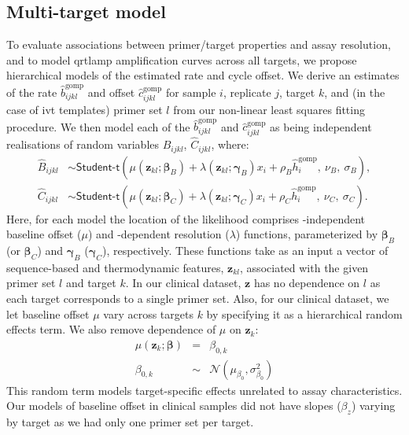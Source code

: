 \documentclass[../thesis.tex]{subfiles}
\begin{document}
\subsection{Multi-target model \label{sec:hierarchicalmodel}}
To evaluate associations between primer/target properties and assay resolution, and to model \gls{qrtlamp} amplification curves across all targets, we propose hierarchical models of the estimated rate and cycle offset. We derive an estimates of the  rate $\hat{b}^{\text{gomp}}_{ijkl}$ and offset $\hat{c}^{\text{gomp}}_{ijkl}$ for sample $i$, replicate $j$, target $k$, and (in the case of \gls{ivt}   templates) primer set $l$ from our non-linear least squares fitting procedure. We then model each of the $\hat{b}^{\text{gomp}}_{ijkl}$ and $\hat{c}^{\text{gomp}}_{ijkl}$ as being independent realisations of random variables $\hat{B}_{ijkl}$, $\hat{C}_{ijkl}$, where: 
\begin{align} 
    \hat{B}_{ijkl}  & \sim  \textsf{Student-t}(\mu(\bm{z}_{kl}; \bm{\beta}_B) + \lambda(\bm{z}_{kl}; \bm{\gamma}_B) x_i + \rho_B \hat{h}^{\text{gomp}}_{i}, \ \nu_B, \ \sigma_B), \label{eq:bhm} \\
    \hat{C}_{ijkl}  & \sim  \textsf{Student-t}(\mu(\bm{z}_{kl}; \bm{\beta}_C) + \lambda(\bm{z}_{kl}; \bm{\gamma}_C) x_i + \rho_C \hat{h}^{\text{gomp}}_{i}, \ \nu_C, \ \sigma_C). \label{eq:chm}
\end{align}
Here, for each model the location of the likelihood comprises -independent baseline offset ($\mu$) and -dependent resolution ($\lambda$) functions, parameterized by $\bm{\beta}_B$ (or $\bm{\beta}_C$) and $\bm{\gamma}_B$ ($\bm{\gamma}_C$), respectively. These functions take as an input a vector of sequence-based and thermodynamic features, $\bm{z}_{kl}$, associated with the given primer set $l$ and target $k$. In our clinical dataset, $\bm{z}$ has no dependence on $l$ as each target corresponds to a single primer set. Also, for our clinical dataset, we let baseline offset $\mu$ vary across targets $k$ by specifying it as a hierarchical random effects term. We also remove dependence of $\mu$ on $\bm{z}_{k}$:
\begin{eqnarray} \label{eq:muclin}
    \mu(\bm{z}_k; \bm{\beta}) &=& \beta_{0,k} \\
    \beta_{0,k} &\sim& \mathcal{N}(\mu_{\beta_{0}},\sigma^{2}_{\beta_{0}})
\end{eqnarray}
This random term models target-specific effects unrelated to assay characteristics. Our models of baseline offset in clinical samples did not have slopes ($\beta_{z}$) varying by target as we had only one primer set per target. 
\end{document}

